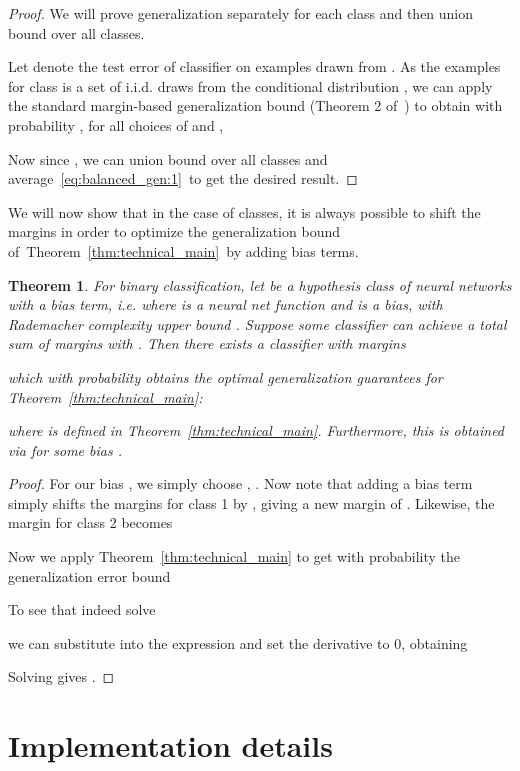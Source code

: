 \documentclass{article}
\newtheorem{theorem}{Theorem}
\begin{document}
\begin{proof}
	
	We will prove generalization separately for each class  and then union bound over all classes. 
	
	Let  denote the test  error of classifier  on examples drawn from . As the examples for class  is a set of  i.i.d. draws from the conditional distribution , we can apply the standard margin-based generalization bound (Theorem 2 of~\citep{kakade2009complexity}) to obtain with probability , for all choices of  and , 
	
	Now since
	, we can union bound over all classes and average~\eqref{eq:balanced_gen:1}~to get the desired result.
\end{proof}

\newcommand{\bias}{b}
\newcommand{\msum}{\beta}
We will now show that in the case of  classes, it is always possible to shift the margins in order to optimize the generalization bound of~Theorem~\ref{thm:technical_main}~by adding bias terms.
\begin{theorem}
	For binary classification, let  be a hypothesis class of neural networks with a bias term, i.e.  where  is a neural net function and  is a bias, with Rademacher complexity upper bound . Suppose some classifier  can achieve a total sum of margins  with . Then there exists a classifier  with margins 
	
	which with probability  obtains the optimal generalization guarantees for Theorem~\ref{thm:technical_main}:
	
	where  is defined in Theorem~\ref{thm:technical_main}. Furthermore, this  is obtained via  for some bias . 
\end{theorem}
\begin{proof}
	For our bias , we simply choose , . Now note that adding a bias term simply shifts the margins for class 1 by , giving a new margin of . Likewise, the margin for class 2 becomes 
	 
	Now we apply Theorem~\ref{thm:technical_main} to get with probability  the generalization error bound
	
	To see that  indeed solve 
	
	we can substitute  into the expression and set the derivative to 0, obtaining
	
		Solving gives . 
\end{proof}

\section{Implementation details} \label{sec:implementation}
\end{document}
